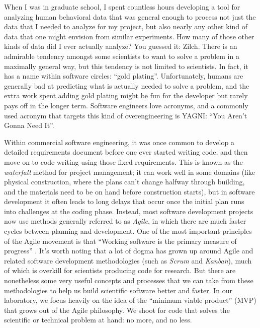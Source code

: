 When I was in graduate school, I spent countless hours developing a tool for analyzing human behavioral data that was general enough to process not just the data that I needed to analyze for my project, but also nearly any other kind of data that one might envision from similar experiments.
How many of those other kinds of data did I ever actually analyze? You guessed it: Zilch.
There is an admirable tendency amongst some scientists to want to solve a problem in a maximally general way, but this tendency is not limited to scientists.
In fact, it has a name within software circles: ``gold plating''.
Unfortunately, humans are generally bad at predicting what is actually needed to solve a problem, and the extra work spent adding gold plating might be fun for the developer but rarely pays off in the longer term.
Software engineers love acronyms, and a commonly used acronym that targets this kind of overengineering is YAGNI: ``You Aren't Gonna Need It''.

Within commercial software engineering, it was once common to develop a detailed requirements document before one ever started writing code, and then move on to code writing using those fixed requirements.
This is known as the \textit{waterfall} method for project management; it can work well in some domains (like physical construction, where the plans can't change halfway through building, and the materials need to be on hand before construction starts), but in software development it often leads to long delays that occur once the initial plan runs into challenges at the coding phase.
Instead, most software development projects now use methods generally referred to as \textit{Agile}, in which there are much faster cycles between planning and development.
One of the most important principles of the Agile movement is that ``Working software is the primary measure of progress'' \citep{Beck:2001aa}.
It's worth noting that a lot of dogma has grown up around Agile and related software development methodologies (such as \textit{Scrum} and \textit{Kanban}), much of which is overkill for scientists producing code for research.
But there are nonetheless some very useful concepts and processes that we can take from these methodologies to help us build scientific software better and faster.
In our laboratory, we focus heavily on the idea of the ``minimum viable product'' (MVP) that grows out of the Agile philosophy.
We shoot for code that solves the scientific or technical problem at hand: no more, and no less.


